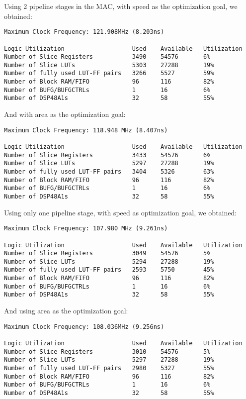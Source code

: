 \documentclass[12pt]{article}
\begin{document}
Using 2 pipeline stages in the MAC, with speed as the optimization goal, we obtained:
	
\begin{verbatim}
Maximum Clock Frequency: 121.908MHz (8.203ns)

Logic Utilization                   Used    Available   Utilization
Number of Slice Registers           3490    54576       6%
Number of Slice LUTs                5303    27288       19%
Number of fully used LUT-FF pairs   3266    5527        59%
Number of Block RAM/FIFO            96      116         82%
Number of BUFG/BUFGCTRLs            1       16          6%
Number of DSP48A1s                  32      58          55%
\end{verbatim}

And with area as the optimization goal:

\begin{verbatim}
Maximum Clock Frequency: 118.948 MHz (8.407ns)

Logic Utilization                   Used    Available   Utilization
Number of Slice Registers           3433    54576       6%
Number of Slice LUTs                5297    27288       19%
Number of fully used LUT-FF pairs   3404    5326        63%	
Number of Block RAM/FIFO            96      116         82%
Number of BUFG/BUFGCTRLs            1       16          6%
Number of DSP48A1s                  32      58          55%
\end{verbatim}

Using only one pipeline stage, with speed as optimization goal, we obtained:

\begin{verbatim}
Maximum Clock Frequency: 107.980 MHz (9.261ns)

Logic Utilization                   Used    Available   Utilization
Number of Slice Registers           3049    54576       5%
Number of Slice LUTs                5294    27288       19%
Number of fully used LUT-FF pairs   2593    5750        45%
Number of Block RAM/FIFO            96      116         82%
Number of BUFG/BUFGCTRLs            1       16          6%
Number of DSP48A1s                  32      58          55%
\end{verbatim}

And using area as the optimization goal:

\begin{verbatim}
Maximum Clock Frequency: 108.036MHz (9.256ns)

Logic Utilization                   Used    Available   Utilization
Number of Slice Registers           3010    54576       5%
Number of Slice LUTs                5297    27288       19%
Number of fully used LUT-FF pairs   2980    5327        55%
Number of Block RAM/FIFO            96      116         82%
Number of BUFG/BUFGCTRLs            1       16          6%
Number of DSP48A1s                  32      58          55%
\end{verbatim}
\end{document}
